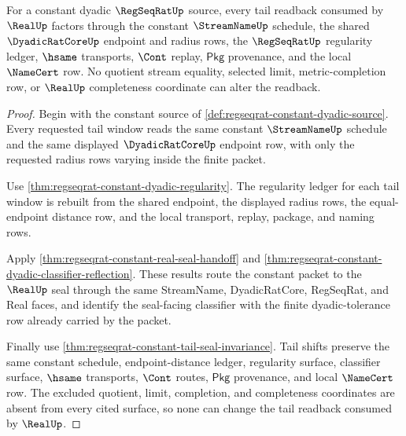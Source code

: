 \begin{theorem}
\label{thm:regseqrat-constant-tail-readback}
For a constant dyadic $\RegSeqRatUp$ source, every tail readback consumed by
$\RealUp$ factors through the constant $\StreamNameUp$ schedule, the shared
$\DyadicRatCoreUp$ endpoint and radius rows, the $\RegSeqRatUp$ regularity
ledger, $\hsame$ transports, $\Cont$ replay, $\mathsf{Pkg}$ provenance, and
the local $\NameCert$ row. No quotient stream equality, selected limit,
metric-completion row, or $\RealUp$ completeness coordinate can alter the
readback.
\end{theorem}
\begin{proof}
Begin with the constant source of
\autoref{def:regseqrat-constant-dyadic-source}. Every requested tail window
reads the same constant $\StreamNameUp$ schedule and the same displayed
$\DyadicRatCoreUp$ endpoint row, with only the requested radius rows varying
inside the finite packet.

Use \autoref{thm:regseqrat-constant-dyadic-regularity}. The regularity ledger
for each tail window is rebuilt from the shared endpoint, the displayed radius
rows, the equal-endpoint distance row, and the local transport, replay,
package, and naming rows.

Apply \autoref{thm:regseqrat-constant-real-seal-handoff} and
\autoref{thm:regseqrat-constant-dyadic-classifier-reflection}. These results
route the constant packet to the $\RealUp$ seal through the same StreamName,
DyadicRatCore, RegSeqRat, and Real faces, and identify the seal-facing
classifier with the finite dyadic-tolerance row already carried by the packet.

Finally use \autoref{thm:regseqrat-constant-tail-seal-invariance}. Tail shifts
preserve the same constant schedule, endpoint-distance ledger, regularity
surface, classifier surface, $\hsame$ transports, $\Cont$ routes,
$\mathsf{Pkg}$ provenance, and local $\NameCert$ row. The excluded quotient,
limit, completion, and completeness coordinates are absent from every cited
surface, so none can change the tail readback consumed by $\RealUp$.
\end{proof}

